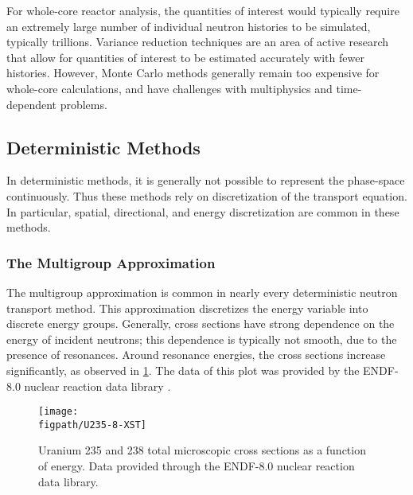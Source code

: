 {{{      For whole-core reactor analysis, the quantities of interest would typically require an extremely large number of individual neutron histories to be simulated, typically trillions.
      Variance reduction techniques are an area of active research that allow for quantities of interest to be estimated accurately with fewer histories. %
      However, Monte Carlo methods generally remain too expensive for whole-core calculations, and have challenges with multiphysics and time-dependent problems.
    }

    \subsection{Deterministic Methods}{\label{ssec:NTT:Deterministic Methods}
      In deterministic methods, it is generally not possible to represent the phase-space continuously.
      Thus these methods rely on discretization of the transport equation.
      In particular, spatial, directional, and energy discretization are common in these methods.
      
      \subsubsection{The Multigroup Approximation}{\label{sssec:NTT:The Multigroup Approximation}
        The multigroup approximation is common in nearly every deterministic neutron transport method.
        This approximation discretizes the energy variable into discrete energy groups.
        Generally, cross sections have strong dependence on the energy of incident neutrons; this dependence is typically not smooth, due to the presence of resonances.
        Around resonance energies, the cross sections increase significantly, as observed in \cref{fig:NTT:Cross Section plot}.
        The data of this plot was provided by the ENDF-8.0 nuclear reaction data library \cite{ENDF8}.

        \begin{figure}[h]
          \centering
          \texttt{[image: \\figpath/U235-8-XST]}
          \caption{Uranium 235 and 238 total microscopic cross sections as a function of energy. Data provided through the ENDF-8.0 nuclear reaction data library.}
          \label{fig:NTT:Cross Section plot}
        \end{figure}

}}}}
